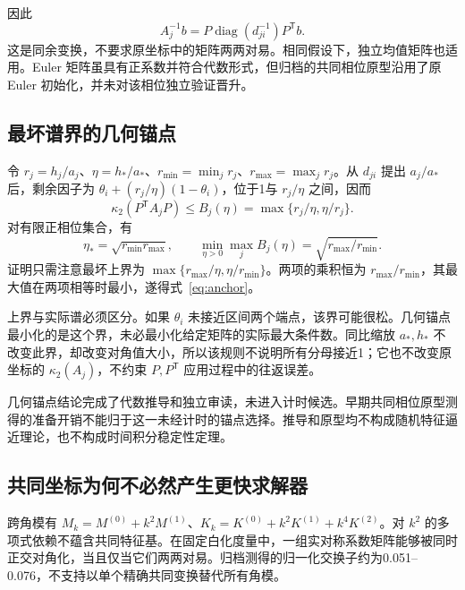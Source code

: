 因此
\begin{equation}
 A_j^{-1}b=P\operatorname{diag}(d_{ji}^{-1})P^{\mathsf T}b.
 \label{eq:phase-inverse}
\end{equation}
这是同余变换，不要求原坐标中的矩阵两两对易。相同假设下，独立均值矩阵也适用。Euler 矩阵虽具有正系数并符合代数形式，但归档的共同相位原型沿用了原 Euler 初始化，并未对该相位独立验证晋升。

\subsection{最坏谱界的几何锚点}

令 \(r_j=h_j/a_j\)、\(\eta=h_*/a_*\)、\(r_{\min}=\min_jr_j\)、\(r_{\max}=\max_jr_j\)。从 \(d_{ji}\) 提出 \(a_j/a_*\) 后，剩余因子为 \(\theta_i+(r_j/\eta)(1-\theta_i)\)，位于1与 \(r_j/\eta\) 之间，因而
\begin{equation}
 \kappa_2(P^{\mathsf T}A_jP)
 \le B_j(\eta)=\max\{r_j/\eta,\eta/r_j\}.
 \label{eq:bound}
\end{equation}
对有限正相位集合，有
\begin{equation}
 \eta_* = \sqrt{r_{\min}r_{\max}},\qquad
 \min_{\eta>0}\max_jB_j(\eta)=\sqrt{r_{\max}/r_{\min}}.
 \label{eq:anchor}
\end{equation}
证明只需注意最坏上界为 \(\max\{r_{\max}/\eta,\eta/r_{\min}\}\)。两项的乘积恒为 \(r_{\max}/r_{\min}\)，其最大值在两项相等时最小，遂得式~\eqref{eq:anchor}。

上界与实际谱必须区分。如果 \(\theta_i\) 未接近区间两个端点，该界可能很松。几何锚点最小化的是这个界，未必最小化给定矩阵的实际最大条件数。同比缩放 \(a_*,h_*\) 不改变此界，却改变对角值大小，所以该规则不说明所有分母接近1；它也不改变原坐标的 \(\kappa_2(A_j)\)，不约束 \(P,P^{\mathsf T}\) 应用过程中的往返误差。

几何锚点结论完成了代数推导和独立审读，未进入计时候选。早期共同相位原型测得的准备开销不能归于这一未经计时的锚点选择。推导和原型均不构成随机特征逼近理论，也不构成时间积分稳定性定理。

\subsection{共同坐标为何不必然产生更快求解器}

跨角模有 \(M_k=M^{(0)}+k^2M^{(1)}\)、\(K_k=K^{(0)}+k^2K^{(1)}+k^4K^{(2)}\)。对 \(k^2\) 的多项式依赖不蕴含共同特征基。在固定白化度量中，一组实对称系数矩阵能够被同时正交对角化，当且仅当它们两两对易。归档测得的归一化交换子约为0.051--0.076，不支持以单个精确共同变换替代所有角模。

